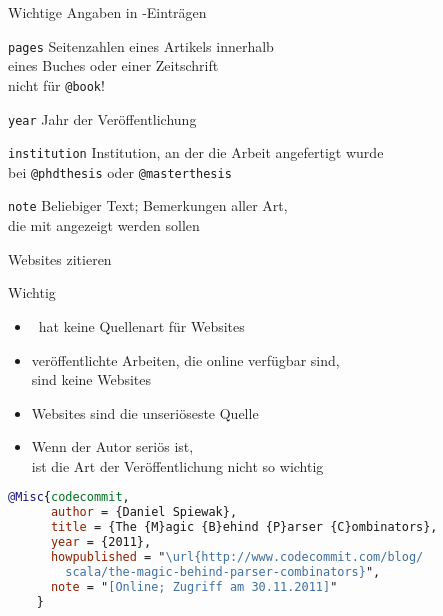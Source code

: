 \begin{Frame}[allowframebreaks]{Wichtige Angaben in \BibTeX-Einträgen}
  \framebreak

  \begin{Block}{\texttt{pages}}
    Seitenzahlen eines Artikels innerhalb\\
    eines Buches oder einer Zeitschrift\\
    \alert{nicht für \lstinline-@book-!}
  \end{Block}

  \begin{Block}{\texttt{year}}
    Jahr der Veröffentlichung
  \end{Block}

  \begin{Block}{\texttt{institution}}
    Institution, an der die Arbeit angefertigt wurde\\
    bei \lstinline-@phdthesis- oder \lstinline-@masterthesis-
  \end{Block}

  \begin{Block}{\texttt{note}}
    Beliebiger Text; Bemerkungen aller Art,\\
    die mit angezeigt werden sollen
  \end{Block}
\end{Frame}

\begin{Frame}[fragile]{Websites zitieren}
  \begin{alertblock}{Wichtig}
    \begin{itemize}
      \item \BibTeX\ hat \alert{keine Quellenart} für Websites
      \item veröffentlichte Arbeiten, die online verfügbar sind,\\
        sind \alert{keine Websites}
      \item Websites sind die \alert{unseriöseste Quelle}
      \item Wenn der \alert{Autor seriös} ist,\\
        ist die Art der Veröffentlichung nicht so wichtig
    \end{itemize}
  \end{alertblock}

  \xxx

  \begin{lstlisting}[language=BibTeX,gobble=4]
    @Misc{codecommit,
      author = {Daniel Spiewak},
      title = {The {M}agic {B}ehind {P}arser {C}ombinators},
      year = {2011},
      howpublished = "\url{http://www.codecommit.com/blog/
      	scala/the-magic-behind-parser-combinators}",
      note = "[Online; Zugriff am 30.11.2011]"
    }
  \end{lstlisting}
\end{Frame}

